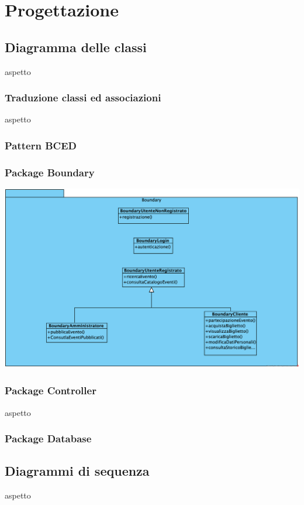 \chapter{Progettazione}
\section{Diagramma delle classi }
aspetto
\subsection{Traduzione classi ed associazioni}
aspetto
\subsection{Pattern BCED}
\subsection{Package Boundary}
\begin{center}	
	\vspace{1ex}
	\includegraphics[height=0.38\linewidth]{assets/package/Boundary.png}
	\vspace{1ex}
\end{center}
\subsection{Package Controller}
aspetto
\subsection{Package Database}

\section{Diagrammi di sequenza}
aspetto
